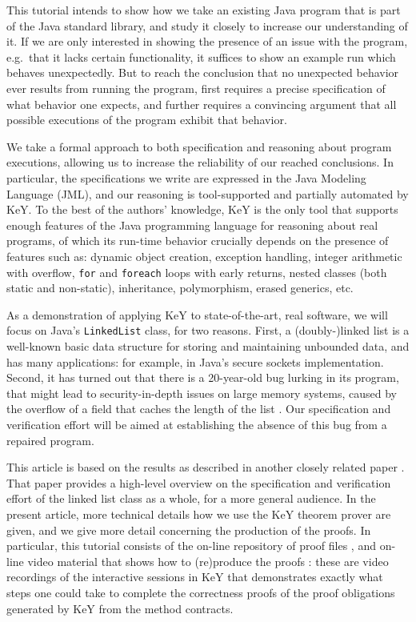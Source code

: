 \documentclass[runningheads]{llncs}
\theoremstyle{remark}
\begin{document}
This tutorial intends to show how we take an existing Java program that is part of the Java standard library, and study it closely to increase our understanding of it. If we are only interested in showing the presence of an issue with the program, e.g.~that it lacks certain functionality, it suffices to show an example run which behaves unexpectedly. But to reach the conclusion that no unexpected behavior ever results from running the program, first requires a precise specification of what behavior one expects, and further requires a convincing argument that all possible executions of the program exhibit that behavior.

We take a formal approach to both specification and reasoning about program executions, allowing us to increase the reliability of our reached conclusions. In particular, the specifications we write are expressed in the Java Modeling Language (JML), and our reasoning is tool-supported and partially automated by KeY. To the best of the authors' knowledge, KeY is the only tool that supports enough features of the Java programming language for reasoning about real programs, of which its run-time behavior crucially depends on the presence of features such as: dynamic object creation, exception handling, integer arithmetic with overflow, \texttt{for} and \texttt{foreach} loops with early returns, nested classes (both static and non-static), inheritance, polymorphism, erased generics, etc.

As a demonstration of applying KeY to state-of-the-art, real software, we will focus on Java's \texttt{LinkedList} class, for two reasons. First, a (doubly-)linked list is a well-known basic data structure for storing and maintaining unbounded data, and has many applications: for example, in Java's secure sockets implementation. Second, it has turned out that there is a 20-year-old bug lurking in its program, that might lead to security-in-depth issues on large memory systems, caused by the overflow of a field that caches the length of the list . Our specification and verification effort will be aimed at establishing the absence of this bug from a repaired program.

This article is based on the results as described in another closely related paper . That paper provides a high-level overview on the specification and verification effort of the linked list class as a whole, for a more general audience. In the present article, more technical details how we use the KeY theorem prover are given, and we give more detail concerning the production of the proofs. In particular, this tutorial consists of the on-line repository of proof files , and on-line video material that shows how to (re)produce the proofs : these are video recordings of the interactive sessions in KeY that demonstrates exactly what steps one could take to complete the correctness proofs of the proof obligations generated by KeY from the method contracts.
\end{document}
